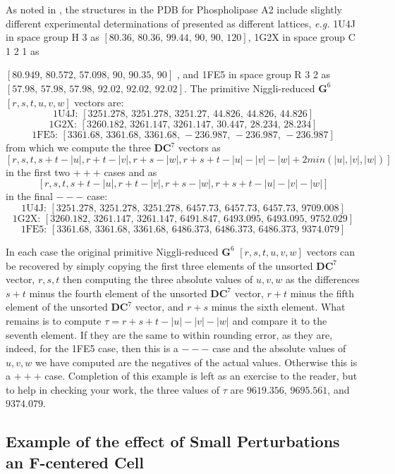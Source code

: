 \documentclass[preprint]{iucr}              %
\begin{document}
As noted in \cite{McGill2013}, the structures in the PDB for Phospholipase
A2 include slightly different experimental determinations of presented
as different lattices, {\it e.g.} 1U4J in space group H 3 as 
$ [ 80.36,\,	80.36,\,	99.44,\,	90,\,	90,\,	120 ] $,
 1G2X in space group C 1 2 1 as
 
$ [ 80.949,\,	80.572,\,	57.098,\,	90,\,	90.35,\,	90] $ , and 1FE5 in space group R 3 2 as
$ [ 57.98,\,	57.98,\,	57.98,\,	92.02,\,	92.02,\,	92.02 ] $.
The primitive Niggli-reduced $\mathbf{G}^6$ $[r,s,t,u,v,w ]$ vectors are:
$$ \text{1U4J:  } [ 3251.278,\,	3251.278,\,	3251.27,\,	44.826,\,	44.826,\,	44.826  ] $$
$$ \text{1G2X:  } [ 3260.182,\,	3261.147,\,	3261.147,\,	30.447,\,	28.234,\,	28.234  ] $$
$$ \text{1FE5:  } [ 3361.68,\,	3361.68,\,	3361.68,\,	-236.987,\,	-236.987,\,	-236.987 ] $$
from which we compute the three $\mathbf{DC}^7$ vectors as
$$ [ r,s,t,s+t-|u|, r+t-|v|, r+s-|w|, r+s+t-|u|-|v|-|w|+2 min(|u|,|v|,|w|)] $$
in the first two $+++$ cases and as
$$ [ r,s,t,s+t-|u|, r+t-|v|, r+s-|w|, r+s+t-|u|-|v|-|w|] $$
in the final $---$ case:
$$ \text{1U4J:  } [ 3251.278,\,	3251.278,\,	3251.278,\,	6457.73,\,	6457.73,\,	6457.73,\,	9709.008 ] $$
$$ \text{1G2X:  } [ 3260.182,\,	3261.147,\,	3261.147,\,	6491.847,\,	6493.095,\,	6493.095,\,	9752.029 ] $$
$$ \text{1FE5:  } [ 3361.68,\,	3361.68,\,	3361.68,\,	6486.373,\,	6486.373,\,	6486.373,\,	9374.079 ] $$

In each case the original primitive Niggli-reduced $\mathbf{G}^6$ $[r,s,t,u,v,w ]$ vectors can be recovered by simply copying the first three elements of
the unsorted $\mathbf{DC}^7$ vector, $r,s,t$ then computing the three absolute values of $u,v,w$ as the differences $s+t$ minus the fourth element of the
unsorted $\mathbf{DC}^7$ vector, $r+t$ minus the fifth element of the
unsorted $\mathbf{DC}^7$ vector, and $r+s$ minus the sixth element.  
What remains is to compute $\tau = r+s+t-|u|-|v|-|w|$ and compare it to the
seventh element.  If they are the same to within rounding error, as they
are, indeed, for the 1FE5 case, then this is a $---$ case and the absolute
values of $u,v,w$ we have computed are the negatives of the actual values.
Otherwise this is a $+++$ case.  Completion of this example is left as an
exercise to the reader, but to help in checking your work, the three
values of $\tau$ are $9619.356$, $9695.561$, and $9374.079$. 
  
\subsection{Example of the effect of Small Perturbations an F-centered Cell}
\end{document}
